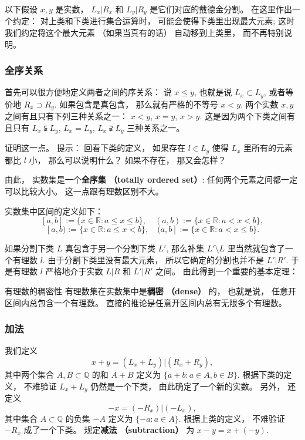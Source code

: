 以下假设 $x,y$ 是实数， $L_x| R_x$ 和 $L_y| R_y$ 是它们对应的戴德金分割。 在这里作出一个约定： 对上类和下类进行集合运算时， 可能会使得下类里出现最大元素; 这时我们约定将这个最大元素 （如果当真有的话） 自动移到上类里， 而不再特别说明。

\subsubsection{全序关系}

首先可以很方便地定义两者之间的序关系： 说 $x\leq y$, 也就是说 $L_x\subset L_y$, 或者等价地 $R_x\supset R_y$. 如果包含是真包含， 那么就有严格的不等号 $x<y$. 两个实数 $x,y$ 之间有且只有下列三种关系之一： $x<y$, $x=y$, $x>y$. 这是因为两个下类之间有且只有 $L_x\subsetneqq L_y$, $L_x=L_y$, $L_x\supsetneqq L_y$ 三种关系之一。

\begin{exercise}{}
证明这一点。 提示： 回看下类的定义， 如果存在 $l\in L_y$ 使得 $L_x$ 里所有的元素都比 $l$ 小， 那么可以说明什么？ 如果不存在， 那又会怎样？
\end{exercise}

由此， 实数集是一个\textbf{全序集 （totally ordered set）}: 任何两个元素之间都一定可以比较大小。 这一点跟有理数区别不大。

实数集中区间的定义如下： 
$$
[a,b]:=\{x\in\mathbb{R}:a\leq x\leq b\},
\quad
(a,b):=\{x\in\mathbb{R}:a< x< b\},
$$
$$
[a,b):=\{x\in\mathbb{R}:a\leq x< b\},
\quad
(a,b]:=\{x\in\mathbb{R}:a< x\leq b\}.
$$

如果分割下类 $L$ 真包含于另一个分割下类 $L'$, 那么补集 $L'\setminus L$ 里当然就包含了一个有理数 $l$. 由于分割下类里没有最大元素， 所以它确定的分割也并不是 $L'|R'$. 于是有理数 $l$ 严格地介于实数 $L|R$ 和 $L'|R'$ 之间。 由此得到一个重要的基本定理：
\begin{theorem}{有理数的稠密性}
有理数集在实数集中是\textbf{稠密 （dense）} 的， 也就是说， 任意开区间内总包含一个有理数。 直接的推论是任意开区间内总有无限多个有理数。
\end{theorem}

\subsubsection{加法}

我们定义
$$
x+y=(L_x+L_y)|(R_x+R_y),
$$
其中两个集合 $A,B\subset\mathbb{Q}$ 的和 $A+B$ 定义为 $\{a+b:a\in A, b\in B\}$. 根据下类的定义， 不难验证 $L_x+L_y$ 仍然是一个下类， 由此确定了一个新的实数。 另外， 还定义
$$
-x=(-R_x)|(-L_x),
$$
其中集合 $A\subset\mathbb{Q}$ 的负集 $-A$ 定义为 $\{-a:a\in A\}$. 根据上类的定义， 不难验证 $-R_x$ 成了一个下类。 规定\textbf{减法 （subtraction）} 为 $x-y=x+(-y)$.

